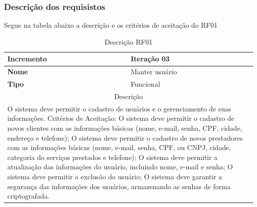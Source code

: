 \begin{table}[htb]
\begin{tabular}{|l|p{8cm}|p{3cm}|}
	\end{tabular}
\end{table}


\subsubsection{ Descrição dos requisistos}
\clearpage
Segue na tabela abaixo a descrição e os critérios de aceitação do RF01
\begin{table}[htb]
	\centering
	\caption{\label{Formatação do texto.}Descrição RF01}	
	\begin{tabular}{|l|p{11cm}|}
		\hline
		\textbf{Incremento}    & Iteração 03\\ \hline
		\textbf{Nome}    & Manter usuário\\ \hline
		\textbf{Tipo}    & Funcional\\ \hline
		\multicolumn{2}{|c|}{Descrição}\\ \hline
		\multicolumn{2}{|p{12cm}|}{
			O sistema deve permitir o cadastro de usuários e o gerenciamento de suas informações. \newline
			\newline Critérios de Aceitação: \newline
			O sistema deve permitir o cadastro de novos clientes com as informações básicas (nome, e-mail, senha, CPF, cidade, endereço e telefone); \newline
			\newline O sistema deve permitir o cadastro de novos prestadores com as informações básicas (nome, e-mail, senha, CPF, ou CNPJ, cidade, categoria do serviços prestados e telefone); \newline
			\newline O sistema deve permitir a atualização das informações do usuário, incluindo nome, e-mail e senha; \newline
			\newline O sistema deve permitir a exclusão do usuário; \newline
			O sistema deve garantir a segurança das informações dos usuários, armazenando as senhas de forma criptografada.
			} \\ \hline
	\end{tabular}
\end{table}

